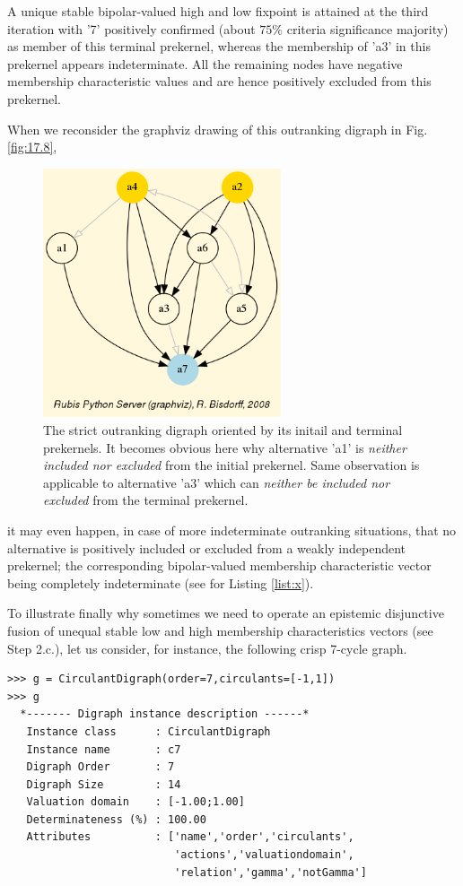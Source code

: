 A unique stable bipolar-valued high and low fixpoint is attained at the third iteration with '7' positively confirmed (about $75\%$ criteria significance majority) as member of this terminal prekernel, whereas the membership of 'a3' in this prekernel appears indeterminate. All the remaining nodes have negative membership characteristic values and are hence positively excluded from this prekernel.

When we reconsider the graphviz drawing of this outranking digraph in Fig. \ref{fig:17.8},
\begin{figure}[h]
\sidecaption
\includegraphics[width=7cm]{Figures/bestWorstOrientation.png}
\caption{The strict outranking digraph oriented by its initail and terminal prekernels. It becomes obvious here why alternative 'a1' is \emph{neither included nor excluded} from the initial prekernel. Same observation is applicable to alternative 'a3' which can \emph{neither be included nor excluded} from the terminal prekernel.}
\end{figure}
it may even happen, in case of more indeterminate outranking situations, that no alternative  is positively included or excluded from a weakly independent prekernel; the corresponding bipolar-valued membership characteristic vector being completely indeterminate (see for Listing \ref{list:x}).

To illustrate finally why sometimes we need to operate an epistemic disjunctive fusion of unequal stable low and high membership characteristics vectors (see Step 2.c.), let us consider, for instance, the following crisp 7-cycle graph.
\begin{lstlisting}
>>> g = CirculantDigraph(order=7,circulants=[-1,1])
>>> g			     
  *------- Digraph instance description ------*
   Instance class      : CirculantDigraph
   Instance name       : c7
   Digraph Order       : 7
   Digraph Size        : 14
   Valuation domain    : [-1.00;1.00]
   Determinateness (%) : 100.00
   Attributes          : ['name','order','circulants',
                          'actions','valuationdomain',
                          'relation','gamma','notGamma']
\end{lstlisting}		       


